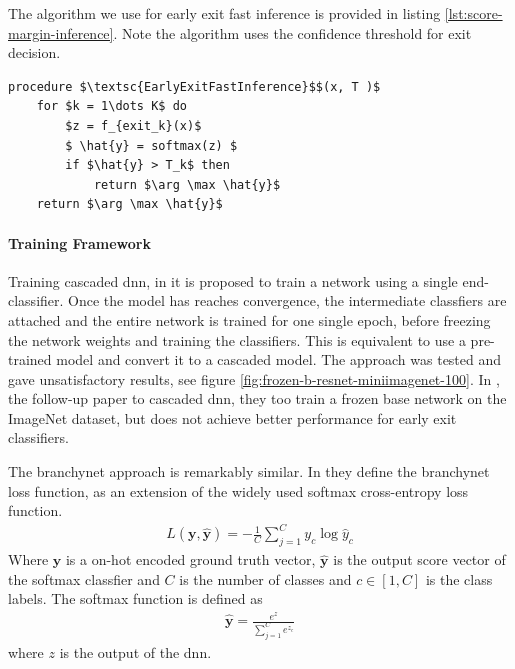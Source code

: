The algorithm we use for early exit fast inference is provided in listing \ref{lst:score-margin-inference}. Note the algorithm uses the confidence threshold for exit decision.

\begin{minipage}{\linewidth}
	\begin{lstlisting}[language = {}, mathescape=true, caption={Early Exit using Score-margin }, label={lst:score-margin-inference}]
procedure $\textsc{EarlyExitFastInference}$$(x, T )$
	for $k = 1\dots K$ do
		$z = f_{exit_k}(x)$
		$ \hat{y} = softmax(z) $
		if $\hat{y} > T_k$ then
			return $\arg \max \hat{y}$
	return $\arg \max \hat{y}$ 
	\end{lstlisting}
\end{minipage} 

\paragraph{Training Framework} 
Training cascaded \gls{dnn}, in \cite{leroux_resource-constrained_2015} it is proposed to train a network using a single end-classifier. Once the model has reaches convergence, the intermediate classfiers are attached and the entire network is trained for one single epoch, before freezing the network weights and training the classifiers. This is equivalent to use a pre-trained model and convert it to a cascaded model. The approach was tested and gave unsatisfactory results, see figure \ref{fig:frozen-b-resnet-miniimagenet-100}. In \cite{leroux_cascading_2017}, the follow-up paper to cascaded \gls{dnn}, they too train a frozen base network on the ImageNet dataset, but does not achieve better performance for early exit classifiers.  

The \gls{branchynet} approach is remarkably similar. In \cite{teerapittayanon_branchynet:_2016} they define the \gls{branchynet} loss function, as an extension of the widely used softmax cross-entropy loss function.
\begin{align}
L\left(\mathbf{y},\hat{\mathbf{y}}\right) = - \frac{1}{C} \sum_{j =1}^{C} y_c \log \hat{y}_c
\end{align}
Where $ \bm{y} $ is a on-hot encoded ground truth vector, $ \bm{\hat{y}} $ is the output score vector of the softmax classfier and $ C $ is the number of classes and $ c \in \left[1, C\right] $ is the class labels. The softmax function is defined as
\begin{align}
 \bm{\hat{y}} = \frac{e^{z}}{\sum_{j=1}^{C}e^{z_c}}
\end{align}
where $ z $ is the output of the \gls{dnn}.
	
